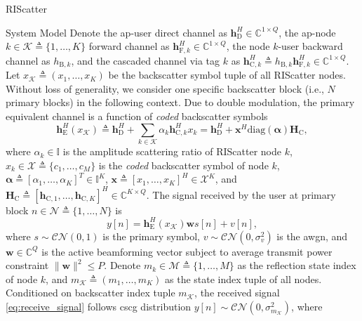 \documentclass[journal]{IEEEtran}
\begin{document}
\begin{section}{RIScatter}
\begin{subsection}{System Model}
		Denote the \gls{ap}-user direct channel as $\boldsymbol{h}_{\mathrm{D}}^H \in \mathbb{C}^{1 \times Q}$, the \gls{ap}-node $k \in \mathcal{K} \triangleq \{1,\ldots,K\}$ forward channel as $\boldsymbol{h}_{\mathrm{F},k}^H \in \mathbb{C}^{1 \times Q}$, the node $k$-user backward channel as $h_{\mathrm{B},k}$, and the cascaded channel via tag $k$ as $\boldsymbol{h}_{\mathrm{C},k}^H \triangleq h_{\mathrm{B},k} \boldsymbol{h}_{\mathrm{F},k}^H \in \mathbb{C}^{1 \times Q}$.
		Let $x_{\mathcal{K}} \triangleq (x_1,\ldots,x_K)$ be the backscatter symbol tuple of all RIScatter nodes.
		Without loss of generality, we consider one specific backscatter block (i.e., $N$ primary blocks) in the following context.
		Due to double modulation, the primary equivalent channel is a function of \emph{coded} backscatter symbols
		\begin{equation}
			\boldsymbol{h}_{\mathrm{E}}^H(x_{\mathcal{K}}) \triangleq \boldsymbol{h}_{\mathrm{D}}^H + \sum_{k \in \mathcal{K}} \alpha_k \boldsymbol{h}_{\mathrm{C},k}^H x_k = \boldsymbol{h}_{\mathrm{D}}^H + \boldsymbol{x}^H \mathrm{diag}(\boldsymbol{\alpha}) \boldsymbol{H}_{\mathrm{C}},
			\label{eq:equivalent_channel}
		\end{equation}
		where $\alpha_k \in \mathbb{I}$ is the amplitude scattering ratio of RIScatter node $k$, $x_k \in \mathcal{X} \triangleq \{c_1,\ldots,c_M\}$ is the \emph{coded} backscatter symbol of node $k$, $\boldsymbol{\alpha} \triangleq [\alpha_1,\ldots,\alpha_K]^T \in \mathbb{I}^{K}$, $\boldsymbol{x} \triangleq [x_1,\ldots,x_K]^H \in \mathcal{X}^{K}$, and $\boldsymbol{H}_{\mathrm{C}} \triangleq [\boldsymbol{h}_{\mathrm{C},1},\ldots,\boldsymbol{h}_{\mathrm{C},K}]^H \in \mathbb{C}^{K \times Q}$. The signal received by the user at primary block $n \in \mathcal{N} \triangleq \{1,\ldots,N\}$ is
		\begin{equation}
			y[n] = \boldsymbol{h}_{\mathrm{E}}^H(x_{\mathcal{K}}) \boldsymbol{w} s[n] + v[n],
			\label{eq:receive_signal}
		\end{equation}
		where $s \sim \mathcal{CN}(0,1)$ is the primary symbol, $v \sim \mathcal{CN}(0,\sigma_v^2)$ is the \gls{awgn}, and $\boldsymbol{w} \in \mathbb{C}^{Q}$ is the active beamforming vector subject to average transmit power constraint $\lVert \boldsymbol{w} \rVert^2 \le P$.
		Denote $m_k \in \mathcal{M} \triangleq \{1,\ldots,M\}$ as the reflection state index of node $k$, and $m_{\mathcal{K}} \triangleq (m_1,\ldots,m_K)$ as the state index tuple of all nodes.
		Conditioned on backscatter index tuple $m_{\mathcal{K}}$, the received signal \eqref{eq:receive_signal} follows \gls{cscg} distribution $y[n] \sim \mathcal{CN}(0,\sigma_{m_{\mathcal{K}}}^2)$, where

\end{subsection}
\end{section}
\end{document}

